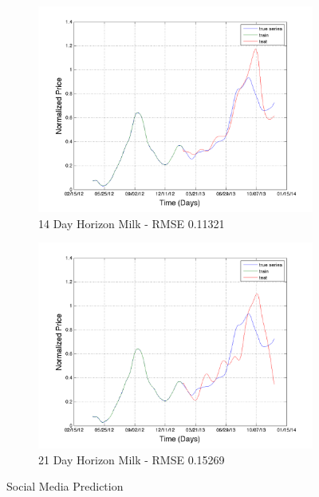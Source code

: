 \begin{figure}
        \begin{subfigure}[b]{0.5\textwidth}
                \includegraphics[width=\textwidth]{img/model/milk/model3_3/pred_14}
                \caption{14 Day Horizon Milk - RMSE 0.11321  }
                \label{fig:tiger}
        \end{subfigure}%
              \begin{subfigure}[b]{0.5\textwidth}
                \includegraphics[width=\textwidth]{img/model/milk/model3_3/pred_21}
                \caption{21 Day Horizon Milk  - RMSE 0.15269 }
                \label{fig:tiger}
        \end{subfigure}%
        \caption{Social Media Prediction}\label{fig:comp_exp}
\end{figure}















